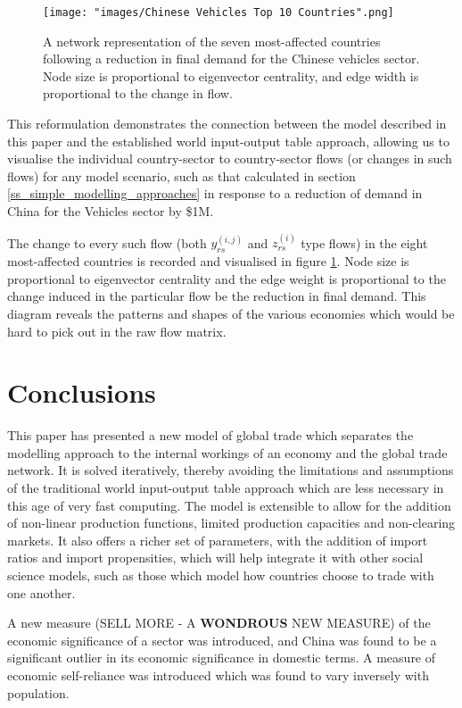 \documentclass[a4paper]{article}
\begin{document}
\begin{figure}[tb]
\centering
\texttt{[image: "images/Chinese Vehicles Top 10 Countries".png]}
\caption{A network representation of the seven most-affected countries following a reduction in final demand for the Chinese vehicles sector. Node size is proportional to eigenvector centrality, and edge width is proportional to the change in flow.}\label{fig:chnvehtop6}
\end{figure}

This reformulation demonstrates the connection between the model described in this paper and the established world input-output table approach, allowing us to visualise the individual country-sector to country-sector flows (or changes in such flows) for any model scenario, such as that calculated in section \ref{ss_simple_modelling_approaches} in response to a reduction of demand in China for the Vehicles sector by \$1M.

The change to every such flow (both $y_{rs}^{(i,j)}$ and $z_{rs}^{(i)}$ type flows) in the eight most-affected countries is recorded and visualised in figure \ref{fig:chnvehtop6}.
Node size is proportional to eigenvector centrality and the edge weight is proportional to the change induced in the particular flow be the reduction in final demand.
This diagram reveals the patterns and shapes of the various economies which would be hard to pick out in the raw flow matrix.


\section{Conclusions}\label{sec:conclusions}
This paper has presented a new model of global trade which separates the modelling approach to the internal workings of an economy and the global trade network. 
It is solved iteratively, thereby avoiding the limitations and assumptions of the traditional world input-output table approach which are less necessary in this age of very fast computing.
The model is extensible to allow for the addition of non-linear production functions, limited production capacities and non-clearing markets.
It also offers a richer set of parameters, with the addition of import ratios and import propensities, which will help integrate it with other social science models, such as those which model how countries choose to trade with one another.

A new measure (SELL MORE - A \textbf{WONDROUS} NEW MEASURE)  of the economic significance of a sector was introduced, and China was found to be a significant outlier in its economic significance in domestic terms.
A measure of economic self-reliance was introduced which was found to vary inversely with population.
\end{document}
